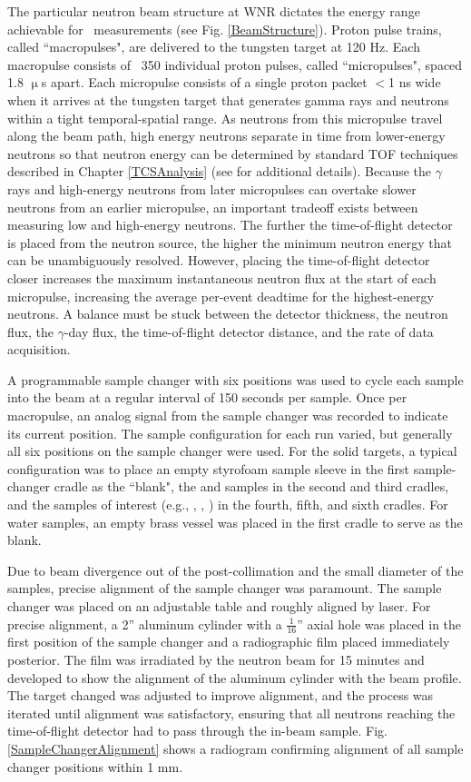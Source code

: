 The particular neutron beam structure at WNR dictates the energy range
achievable for \tot\ measurements (see Fig. \ref{BeamStructure}).
Proton pulse trains, called ``macropulses", are delivered to the tungsten target at 120 Hz.
Each macropulse consists of ~350 individual proton pulses, called ``micropulses", spaced 1.8 
$\upmu$s apart. Each micropulse consists of a single proton packet $<$1 ns wide when it 
arrives at the tungsten target that generates gamma rays and neutrons within a tight
temporal-spatial range. As neutrons from this micropulse travel along the beam path, 
high energy neutrons separate in time from lower-energy neutrons so that neutron
energy can be determined by standard TOF techniques described in Chapter
\ref{TCSAnalysis} (see \cite{Moore1980} for additional details).
Because the $\gamma$ rays and high-energy neutrons from later micropulses can
overtake slower neutrons from an earlier micropulse, an important tradeoff
exists between measuring low and high-energy neutrons. The further the time-of-flight
detector is placed from the neutron source, the higher the minimum neutron energy that can be 
unambiguously resolved. However, placing the time-of-flight detector closer
increases the maximum instantaneous neutron flux at the start of each
micropulse, increasing the average per-event deadtime for the highest-energy
neutrons. A balance must be stuck between the detector thickness, the neutron
flux, the $\gamma$-day flux, the time-of-flight detector distance, and the rate
of data acquisition.

A programmable sample changer with six positions
was used to cycle each sample into the beam at a regular interval of 150 seconds 
per sample. Once per macropulse, an analog signal from the sample changer was recorded to 
indicate its current position. The sample configuration for each run varied, but
generally all six positions on the sample changer were used. For the solid targets,
a typical configuration was to place an empty styrofoam sample sleeve in the
first sample-changer cradle as
the ``blank", the \cNat and \pbNat samples in the second and third
cradles, and the samples of interest (e.g., \niEight, \niNat, \niFour) in
the fourth, fifth, and sixth cradles. For water samples, an empty brass vessel
was placed in the first cradle to serve as the blank.

Due to beam divergence out of the post-collimation and the small diameter of the
samples, precise alignment of the sample changer was paramount. The sample
changer was placed on an adjustable table and roughly aligned by laser. For
precise alignment, a 2'' aluminum cylinder with a
$\frac{1}{16}$'' axial hole was placed
in the first position of the sample changer and a radiographic film placed
immediately posterior. The film was irradiated by the neutron beam for 15
minutes and developed to show the alignment of the aluminum cylinder with the
beam profile. The target changed was adjusted to improve alignment, and the process was
iterated until alignment was satisfactory, ensuring that all neutrons
reaching the time-of-flight detector had to pass through the in-beam sample.
Fig. \ref{SampleChangerAlignment} shows a radiogram confirming alignment of all
sample changer positions within 1 mm.


